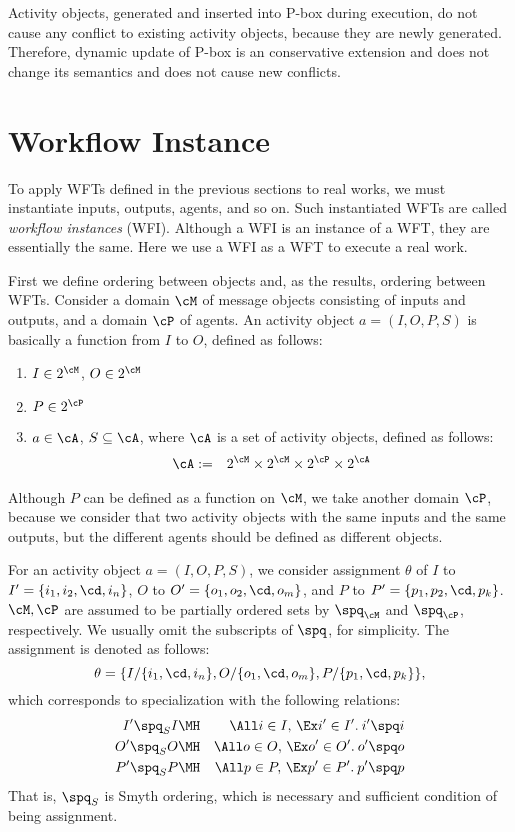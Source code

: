 Activity objects, generated and inserted into P-box during execution,
do not cause any conflict to existing activity objects, because they
are newly generated.
Therefore, dynamic update of P-box is an conservative extension
and does not change its semantics and does not cause new conflicts.

\section{Workflow Instance}
\label{sec:workflowinstance}

To apply WFTs defined in the previous sections to real works,
we must instantiate inputs, outputs, agents, and so on.
Such instantiated WFTs are called {\em workflow instances} (WFI)\@.
Although a WFI is an instance of a WFT, they are essentially the same.
Here we use a WFI as a WFT to execute a real work.

First we define ordering between objects and, as the results, ordering 
between WFTs.
Consider a domain $\cM$ of message objects consisting of inputs and outputs,
and a domain $\cP$ of agents.
An activity object $a=(I,O,P,S)$ is basically a function from $I$ to $O$,
defined as follows:
\begin{enumerate}\itemsep0mm\parskip0mm
\item $I\in 2^\cM$, $O\in 2^\cM$
\item $P\in 2^\cP$
\item $a\in\cA$, $S\subseteq\cA$, where $\cA$ is a set of activity objects,
defined as follows:
\begin{eqnarray*}
\cA&:=&2^\cM\times 2^\cM\times 2^\cP\times 2^\cA
\end{eqnarray*}
\end{enumerate}

Although $P$ can be defined as a function on $\cM$, we take another
domain $\cP$, because we consider that two activity objects with the
same inputs and the same outputs, but the different agents should be
defined as different objects.

For an activity object $a=(I,O,P,S)$, we consider assignment $\theta$ of
$I$ to $I'=\{i_1,i_2,\cd,i_n\}$, $O$ to $O'=\{o_1,o_2,\cd,o_m\}$, and
$P$ to $P'=\{p_1,p_2,\cd,p_k\}$.
$\cM,\cP$ are assumed to be partially ordered sets by $\spq_\cM$ and
$\spq_\cP$, respectively.
We usually omit the subscripts of $\spq$, for simplicity.
The assignment is denoted as follows:
\[\theta=
	\{I/\{i_1,\cd,i_n\},O/\{o_1,\cd,o_m\},P/\{p_1,\cd,p_k\}\},\]
which corresponds to specialization with the following relations:
\begin{eqnarray*}
I'\spq_S I&\MH&\All i\in I,\, \Ex i'\in I'.\: i'\spq i\\
O'\spq_S O&\MH&\All o\in O,\, \Ex o'\in O'.\: o'\spq o\\
P'\spq_S P&\MH&\All p\in P,\, \Ex p'\in P'.\: p'\spq p
\end{eqnarray*}
That is, $\spq_S$ is Smyth ordering, which is necessary and sufficient 
condition of being assignment.

